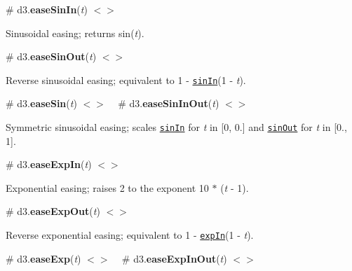 \label{_easeSinIn}%
\# d3.{\bfseries ease\+Sin\+In}({\itshape t}) \href{https://github.com/d3/d3-ease/blob/master/src/sin.js#L4}{\tt $<$$>$}

Sinusoidal easing; returns sin({\itshape t}).

\href{http://bl.ocks.org/mbostock/248bac3b8e354a9103c4/#sinIn}{\tt }

\label{_easeSinOut}%
\# d3.{\bfseries ease\+Sin\+Out}({\itshape t}) \href{https://github.com/d3/d3-ease/blob/master/src/sin.js#L8}{\tt $<$$>$}

Reverse sinusoidal easing; equivalent to 1 -\/ \href{#easeSinIn}{\tt sin\+In}(1 -\/ {\itshape t}).

\href{http://bl.ocks.org/mbostock/248bac3b8e354a9103c4/#sinOut}{\tt }

\label{_easeSin}%
\# d3.{\bfseries ease\+Sin}({\itshape t}) \href{https://github.com/d3/d3-ease/blob/master/src/sin.js}{\tt $<$$>$} ~\newline
\label{_easeSinInOut}%
\# d3.{\bfseries ease\+Sin\+In\+Out}({\itshape t}) \href{https://github.com/d3/d3-ease/blob/master/src/sin.js#L12}{\tt $<$$>$}

Symmetric sinusoidal easing; scales \href{#easeSinIn}{\tt sin\+In} for {\itshape t} in \mbox{[}0, 0.\mbox{]} and \href{#easeSinOut}{\tt sin\+Out} for {\itshape t} in \mbox{[}0., 1\mbox{]}.

\href{http://bl.ocks.org/mbostock/248bac3b8e354a9103c4/#sinInOut}{\tt }

\label{_easeExpIn}%
\# d3.{\bfseries ease\+Exp\+In}({\itshape t}) \href{https://github.com/d3/d3-ease/blob/master/src/exp.js#L1}{\tt $<$$>$}

Exponential easing; raises 2 to the exponent 10 $\ast$ ({\itshape t} -\/ 1).

\href{http://bl.ocks.org/mbostock/248bac3b8e354a9103c4/#expIn}{\tt }

\label{_easeExpOut}%
\# d3.{\bfseries ease\+Exp\+Out}({\itshape t}) \href{https://github.com/d3/d3-ease/blob/master/src/exp.js#L5}{\tt $<$$>$}

Reverse exponential easing; equivalent to 1 -\/ \href{#easeExpIn}{\tt exp\+In}(1 -\/ {\itshape t}).

\href{http://bl.ocks.org/mbostock/248bac3b8e354a9103c4/#expOut}{\tt }

\label{_easeExp}%
\# d3.{\bfseries ease\+Exp}({\itshape t}) \href{https://github.com/d3/d3-ease/blob/master/src/exp.js}{\tt $<$$>$} ~\newline
\label{_easeExpInOut}%
\# d3.{\bfseries ease\+Exp\+In\+Out}({\itshape t}) \href{https://github.com/d3/d3-ease/blob/master/src/exp.js#L9}{\tt $<$$>$}

